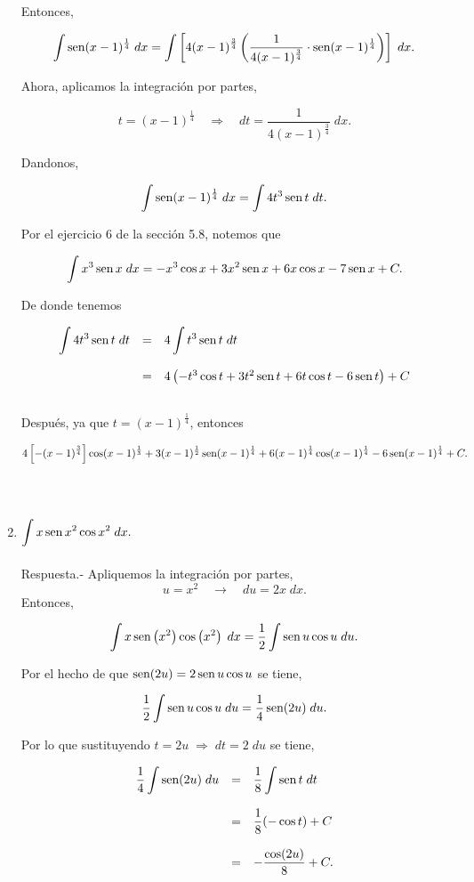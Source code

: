 \begin{enumerate}[\bfseries 1.]
	Entonces, 

	$$\int \mathop{\mbox{\normalfont sen}}\nolimits(x-1)^{\frac{1}{4}}\; dx = \int \left[4(x-1)^{\frac{3}{4}}\left(\dfrac{1}{4(x-1)^{\frac{3}{4}}}\cdot \mathop{\mbox{\normalfont sen}}\nolimits (x-1)^{\frac{1}{4}}\right)\right]\; dx.$$

	Ahora, aplicamos la integración por partes,

	$$t=(x-1)^{\frac{1}{4}}\quad \Rightarrow \quad dt=\dfrac{1}{4(x-1)^{\frac{3}{4}}}\; dx.$$

	Dandonos,

	$$\int \mathop{\mbox{\normalfont sen}}\nolimits (x-1)^{\frac{1}{4}}\; dx = \int 4t^3\mathop{\mbox{\normalfont sen}}\nolimits t\; dt.$$

	Por el ejercicio 6 de la sección 5.8, notemos que

	$$\int x^3\mathop{\mbox{\normalfont sen}}\nolimits x\; dx = -x^3\cos x+3x^2\mathop{\mbox{\normalfont sen}}\nolimits x+6x\cos x-7\mathop{\mbox{\normalfont sen}}\nolimits x + C.$$

	De donde tenemos

	$$
	\begin{array}{rcl}
	    \displaystyle\int 4t^3 \mathop{\mbox{\normalfont sen}}\nolimits t\; dt &=& 4\displaystyle\int t^3\mathop{\mbox{\normalfont sen}}\nolimits t\; dt\\\\
					       &=& 4\left(-t^3\cos t+3t^2\mathop{\mbox{\normalfont sen}}\nolimits t+6t\cos t-6\mathop{\mbox{\normalfont sen}}\nolimits t\right) + C\\\\
	\end{array}
	$$

	Después, ya que $t=(x-1)^{\frac{1}{4}}$, entonces

	$$4\left[-(x-1)^{\frac{3}{4}}\right]\cos (x-1)^{\frac{1}{3}}+3(x-1)^{\frac{1}{2}}\mathop{\mbox{\normalfont sen}}\nolimits(x-1)^{\frac{1}{4}}+6(x-1)^{\frac{1}{4}}\cos(x-1)^{\frac{1}{4}}-6\mathop{\mbox{\normalfont sen}}\nolimits(x-1)^{\frac{1}{4}}+C.$$\\\\


    \item $\displaystyle\int x\mathop{\mbox{\normalfont sen}}\nolimits x^2 \cos x^2\; dx.$\\\\
	Respuesta.-\; Apliquemos la integración por partes,
	$$u=x^2\quad \rightarrow \quad du=2x\; dx.$$
	Entonces,

	$$\int x\mathop{\mbox{\normalfont sen}}\nolimits\left(x^2\right)\cos\left(x^2\right)\; dx = \dfrac{1}{2}\int \mathop{\mbox{\normalfont sen}}\nolimits u \cos u \; du.$$

	Por el hecho de que $\mathop{\mbox{\normalfont sen}}\nolimits(2u)=2\mathop{\mbox{\normalfont sen}}\nolimits u\cos u$ se tiene,

	$$\dfrac{1}{2}\int \mathop{\mbox{\normalfont sen}}\nolimits u \cos u \; du = \dfrac{1}{4}\mathop{\mbox{\normalfont sen}}\nolimits(2u)\; du.$$

	Por lo que sustituyendo $t=2u\; \Rightarrow \; dt=2\; du$ se tiene,

	$$
	\begin{array}{rcl}
	    \dfrac{1}{4}\displaystyle\int \mathop{\mbox{\normalfont sen}}\nolimits(2u)\; du&=&\dfrac{1}{8}\displaystyle\int \mathop{\mbox{\normalfont sen}}\nolimits t\; dt\\\\
	    &=& \dfrac{1}{8}(-\cos t)+C\\\\
	    &=& -\dfrac{\cos(2u)}{8}+C.
	\end{array}
	$$


\end{enumerate}
